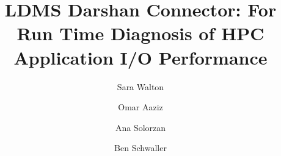 \documentclass[conference]{IEEEtran}
\begin{document}
\title{LDMS Darshan Connector: For Run Time Diagnosis of HPC Application I/O Performance}

\author[1]{Sara Walton}
\author[1]{Omar Aaziz}
\author[2]{Ana Solorzan}
\author[1]{Ben Schwaller}
\makeatletter
\newcommand{\linebreakand}{%
  \end{@IEEEauthorhalign}
  \hfill\mbox{}\par
  \mbox{}\hfill\begin{@IEEEauthorhalign}
}
\makeatother

\maketitle















%
%
\end{document}
